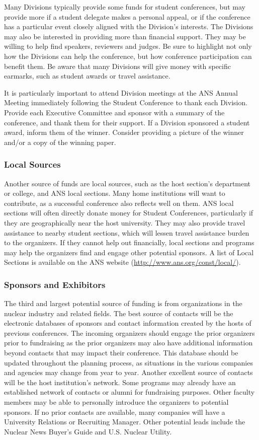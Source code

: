 \documentclass[12pt]{article}
\begin{document}
Many Divisions typically provide some funds for student conferences, but may provide more if a student delegate makes a personal appeal, or if the conference has a particular event closely aligned with the Division's interests.
The Divisions may also be interested in providing more than financial support.
They may be willing to help find speakers, reviewers and judges.
Be sure to highlight not only how the Divisions can help the conference, but how conference participation can benefit them.
Be aware that many Divisions will give money with specific earmarks, such as student awards or travel assistance.

It is particularly important to attend Division meetings at the ANS Annual Meeting immediately following the Student Conference to thank each Division.
Provide each Executive Committee and sponsor with a summary of the conference, and thank them for their support.
If a Division sponsored a student award, inform them of the winner.
Consider providing a picture of the winner and/or a copy of the winning paper.

\subsubsection{Local Sources}
Another source of funds are local sources, such as the host section's department or college, and ANS local sections.
Many home institutions will want to contribute, as a successful conference also reflects well on them.
ANS local sections will often directly donate money for Student Conferences, particularly if they are geographically near the host university.
They may also provide travel assistance to nearby student sections, which will lessen travel assistance burden to the organizers.
If they cannot help out financially, local sections and programs may help the organizers find and engage other potential sponsors.
A list of Local Sections is available on the ANS website (\href{http://www.ans.org/const/local/}{http://www.ans.org/const/local/}).

\subsubsection{Sponsors and Exhibitors}
The third and largest potential source of funding is from organizations in the nuclear industry and related fields.
The best source of contacts will be the electronic databases of sponsors and contact information created by the hosts of previous conferences.
The incoming organizers should engage the prior organizers prior to fundraising as the prior organizers may also have additional information beyond contacts that may impact their conference.
This database should be updated throughout the planning process, as situations in the various companies and agencies may change from year to year.
Another excellent source of contacts will be the host institution's network.
Some programs may already have an established network of contacts or alumni for fundraising purposes.
Other faculty members may be able to personally introduce the organizers to potential sponsors.
If no prior contacts are available, many companies will have a University Relations or Recruiting Manager.
Other potential leads include the Nuclear News Buyer's Guide and U.S. Nuclear Utility.
\end{document}
